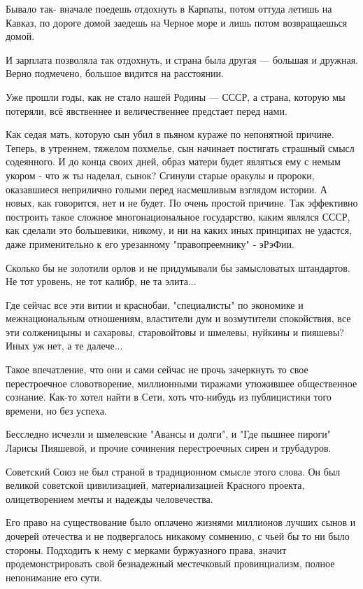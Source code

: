 Бывало так- вначале поедешь отдохнуть в Карпаты, потом оттуда летишь на Кавказ,
по дороге домой заедешь на Черное море и лишь потом возвращаешься домой.

И зарплата позволяла так отдохнуть, и страна была другая --- большая и дружная.
Верно подмечено, большое видится на расстоянии.

Уже прошли годы, как не стало нашей Родины --- СССР, а страна, которую мы
потеряли, всё явственнее и величественнее предстает перед нами.

Как седая мать, которую сын убил в пьяном кураже по непонятной причине. Теперь,
в утреннем, тяжелом похмелье, сын начинает постигать страшный смысл содеянного.
И до конца своих дней, образ матери будет являться ему с немым укором - что ж
ты наделал, сынок?  Сгинули старые оракулы и пророки, оказавшиеся неприлично
голыми перед насмешливым взглядом истории. А новых, как говорится, нет и не
будет. По очень простой причине. Так эффективно построить такое сложное
многонациональное государство, каким являлся СССР, как сделали это большевики,
никому, и ни на каких иных принципах не удастся, даже применительно к его
урезанному "правопреемнику" - эРэФии.

Сколько бы не золотили орлов и не придумывали бы замысловатых штандартов. Не
тот уровень, не тот калибр, не та элита...

Где сейчас все эти витии и краснобаи, "специалисты" по экономике и
межнациональным отношениям, властители дум и возмутители спокойствия, все эти
солженицыны и сахаровы, старовойтовы и шмелевы, нуйкины и пияшевы? Иных уж нет,
а те далече...

Такое впечатление, что они и сами сейчас не прочь зачеркнуть то свое
перестроечное словотворение, миллионными тиражами утюжившее общественное
сознание. Как-то хотел найти в Сети, хоть что-нибудь из публицистики того
времени, но без успеха.

Бесследно исчезли и шмелевские "Авансы и долги", и "Где пышнее пироги" Ларисы
Пияшевой, и прочие сочинения перестроечных сирен и трубадуров.

Советский Союз не был страной в традиционном смысле этого слова. Он был великой
советской цивилизацией, материализацией Красного проекта, олицетворением мечты
и надежды человечества.

Его право на существование было оплачено жизнями миллионов лучших сынов и
дочерей отечества и не подвергалось никакому сомнению, с чьей бы то ни было
стороны. Подходить к нему с мерками буржуазного права, значит
продемонстрировать свой безнадежный местечковый провинциализм, полное
непонимание его сути.

